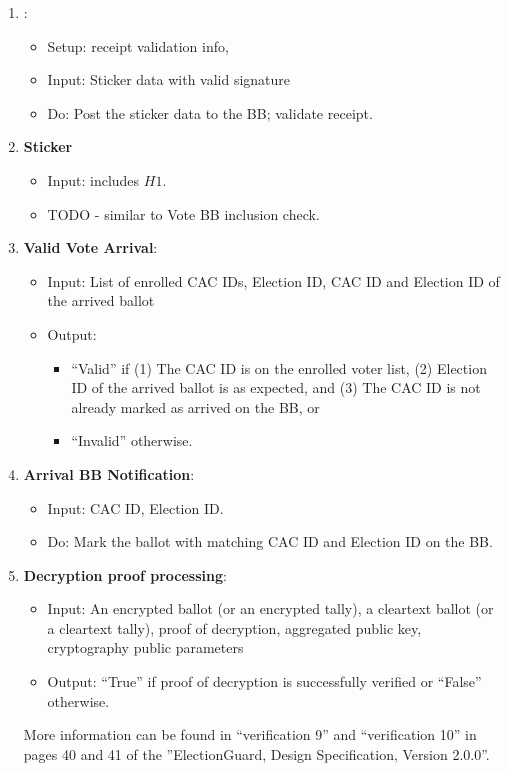 \documentclass{article}
\begin{document}
\begin{enumerate}
\label{Vote BB presence-BB Inc}
    \item \textbf{\StickerBBUpload{}}:
\begin{itemize}
    \item Setup: receipt validation info,
    \item Input: Sticker data with valid signature
    \item Do: Post the sticker data to the BB; validate receipt.
\end{itemize}
\label{Vote BB presence-upload}

    \item \textbf{Sticker \BBInclusionCheck{}}
    \begin{itemize}
        \item Input: includes $H1$.
        \item TODO - similar to Vote BB inclusion check.
    \end{itemize}

    \item \textbf{Valid Vote Arrival}:
\begin{itemize}
    \item Input: List of enrolled CAC IDs, Election ID, CAC ID and Election ID of the arrived ballot
    \item Output: 
    \begin{itemize}
        \item ``Valid'' if     (1) The CAC ID is on the enrolled voter list, (2) Election ID of the arrived ballot is as expected, and (3) The CAC ID is not already marked as arrived on the BB, or
        \item ``Invalid'' otherwise.

    \end{itemize}
\end{itemize}
\label{Valid Vote Arrival}
    \item \textbf{Arrival BB Notification}:
\begin{itemize}
    \item Input: CAC ID, Election ID.
    \item Do: Mark the ballot with matching CAC ID and Election ID on the BB.

\end{itemize}
\label{BB Notification of Valid Vote Arrival}
\item \textbf{Decryption proof processing}:
\begin{itemize}
    \item Input: An encrypted ballot  (or an encrypted tally), a cleartext ballot (or a cleartext tally), proof of decryption, aggregated public key, cryptography public parameters
    \item Output: ``True'' if proof of decryption is successfully verified or ``False'' otherwise.
\end{itemize}
More information can be found in ``verification 9'' and ``verification 10'' in pages 40 and 41 of the ''ElectionGuard, Design Specification,
Version 2.0.0''.
\label{Decryption proof processing}
\end{enumerate}
\end{document}
